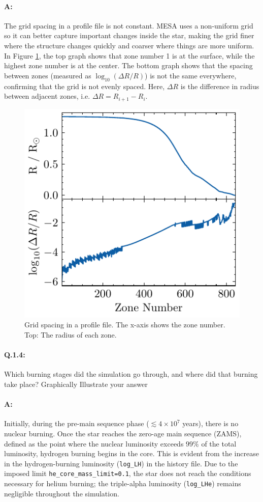 \documentclass[twocolumn,fontsize=11pt]{scrartcl}
\begin{document}
\paragraph{A:} The grid spacing in a profile file is not constant. MESA uses a non-uniform grid so it can better capture important changes inside the star, making the grid finer where the structure changes quickly and coarser where things are more uniform. In Figure \ref{fig:grid_spacing}, the top graph shows that zone number 1 is at the surface, while the highest zone number is at the center. The bottom graph shows that the spacing between zones (measured as \(\log_{10}(\Delta R / R)\)) is not the same everywhere, confirming that the grid is not evenly spaced. Here, \(\Delta R\) is the difference in radius between adjacent zones, i.e. \(\Delta R = R_{i+1} - R_i\).
%
\begin{figure}[htbp]
    \centering
    \includegraphics{R_vs_zone.pdf}
    \caption{Grid spacing in a profile file. The x-axis shows the zone number. Top: The radius of each zone.}
    \label{fig:grid_spacing}
\end{figure}
%
\paragraph{Q.1.4:} Which burning stages did the simulation go through, and where did that burning take
place? Graphically Illustrate your answer

\paragraph{A:} Initially, during the pre-main sequence phase (\(\lesssim 4 \times 10^7\) years), there is no nuclear burning. Once the star reaches the zero-age main sequence (ZAMS), defined as the point where the nuclear luminosity exceeds \(99\%\) of the total luminosity, hydrogen burning begins in the core. This is evident from the increase in the hydrogen-burning luminosity (\texttt{log\_LH}) in the history file. Due to the imposed limit \texttt{he\_core\_mass\_limit=0.1}, the star does not reach the conditions necessary for helium burning; the triple-alpha luminosity (\texttt{log\_LHe}) remains negligible throughout the simulation. 
\end{document}
